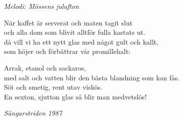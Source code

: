 {\footnotesize\textit{Melodi: Mössens julafton}}\par
\vspace{10pt}
När kaffet är serverat och maten tagit slut\\
och alla dom som blivit alltför fulla kastats ut.\\
då vill vi ha ett nytt glas med något gult och kallt,\\
som höjer och förbättrar vår promillehalt:\par
\vspace{10pt}
Arrak, etanol och sackaros,\\
med salt och vatten blir den bästa blandning som kan fås.\\
Söt och smetig, rent utav viskös.\\
En sexton, sjutton glas så blir man medvetslös!
\par
\vspace{10pt}
{\footnotesize\textit{Sångarstriden 1987}}
